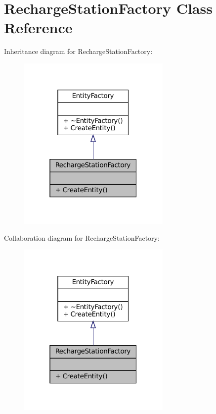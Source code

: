 \hypertarget{classRechargeStationFactory}{}\section{Recharge\+Station\+Factory Class Reference}
\label{classRechargeStationFactory}


Inheritance diagram for Recharge\+Station\+Factory\+:\nopagebreak
\begin{figure}[H]
\begin{center}
\leavevmode
\includegraphics[width=211pt]{classRechargeStationFactory__inherit__graph}
\end{center}
\end{figure}


Collaboration diagram for Recharge\+Station\+Factory\+:\nopagebreak
\begin{figure}[H]
\begin{center}
\leavevmode
\includegraphics[width=211pt]{classRechargeStationFactory__coll__graph}
\end{center}
\end{figure}
